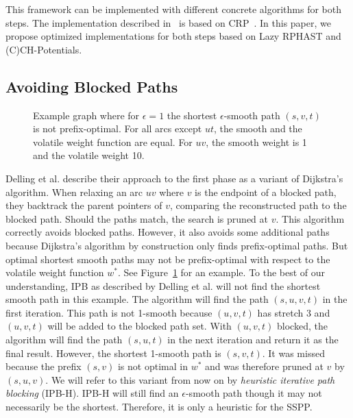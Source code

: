 \documentclass[a4paper,UKenglish,cleveref, autoref, thm-restate]{lipics-v2021}
\begin{document}
This framework can be implemented with different concrete algorithms for both steps.
The implementation described in~\cite{dss-tarrn-18} is based on CRP~\cite{dgpw-crprn-13}.
In this paper, we propose optimized implementations for both steps based on Lazy RPHAST and (C)CH-Potentials.

\subsection{Avoiding Blocked Paths}\label{sec:ipb}

\begin{figure}
\centering
{}
\caption{Example graph where for $\epsilon = 1$ the shortest $\epsilon$-smooth path $(s,v,t)$ is not prefix-optimal. For all arcs except $ut$, the smooth and the volatile weight function are equal. For $uv$, the smooth weight is 1 and the volatile weight 10.}
\label{fig:ipb_counterexample}
\end{figure}

Delling et al. describe their approach to the first phase as a variant of Dijkstra's algorithm.
When relaxing an arc $uv$ where $v$ is the endpoint of a blocked path, they backtrack the parent pointers of $v$, comparing the reconstructed path to the blocked path.
Should the paths match, the search is pruned at $v$.
This algorithm correctly avoids blocked paths.
However, it also avoids some additional paths because Dijkstra's algorithm by construction only finds prefix-optimal paths.
But optimal shortest smooth paths may not be prefix-optimal with respect to the volatile weight function $w^*$.
See Figure~\ref{fig:ipb_counterexample} for an example.
To the best of our understanding, IPB as described by Delling et al. will not find the shortest smooth path in this example.
The algorithm will find the path $(s,u,v,t)$ in the first iteration.
This path is not 1-smooth because $(u,v,t)$ has stretch 3 and $(u,v,t)$ will be added to the blocked path set.
With $(u,v,t)$ blocked, the algorithm will find the path $(s,u,t)$ in the next iteration and return it as the final result.
However, the shortest 1-smooth path is $(s,v,t)$.
It was missed because the prefix $(s,v)$ is not optimal in $w^*$ and was therefore pruned at $v$ by $(s,u,v)$.
We will refer to this variant from now on by \emph{heuristic iterative path blocking} (IPB-H).
IPB-H will still find an $\epsilon$-smooth path though it may not necessarily be the shortest.
Therefore, it is only a heuristic for the SSPP.
\end{document}
